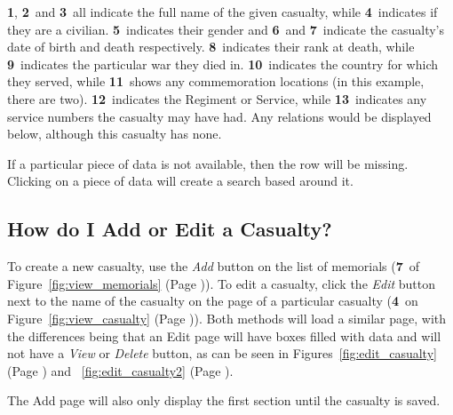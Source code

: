 \documentclass[12pt]{article}
\newcommand{\marker}[1]{\color{red}\textbf{#1}\color{black}}
\newcommand{\myref}[1]{\ref{#1} {\scriptsize(Page \pageref{#1})}}
\begin{document}
\marker{1}, \marker{2}\ and \marker{3}\ all indicate the full name of the given casualty, while \marker{4}\ indicates if they are a civilian. \marker{5}\ indicates their gender and \marker{6}\ and \marker{7}\ indicate the casualty's date of birth and death respectively. \marker{8}\ indicates their rank at death, while \marker{9}\ indicates the particular war they died in. \marker{10}\ indicates the country for which they served, while \marker{11}\ shows any commemoration locations (in this example, there are two). \marker{12}\ indicates the Regiment or Service, while \marker{13}\ indicates any service numbers the casualty may have had. Any relations would be displayed below, although this casualty has none.

\begin{infoBox}
If a particular piece of data is not available, then the row will be missing.\\
Clicking on a piece of data will create a search based around it.
\end{infoBox}

\newpage
\FloatBarrier
\subsection{How do I Add or Edit a Casualty?}\label{ssec:edit_casualty}
To create a new casualty, use the \textit{Add} button on the list of memorials (\marker{7}\ of Figure~\myref{fig:view_memorials}). To edit a casualty, click the \textit{Edit} button next to the name of the casualty on the page of a particular casualty (\marker{4}\ on Figure~\myref{fig:view_casualty}). Both methods will load a similar page, with the differences being that an Edit page will have boxes filled with data and will not have a \textit{View} or \textit{Delete} button, as can be seen in Figures~\myref{fig:edit_casualty} and ~\myref{fig:edit_casualty2}.
\begin{infoBox}
The Add page will also only display the first section until the casualty is saved.
\end{infoBox}
\end{document}
